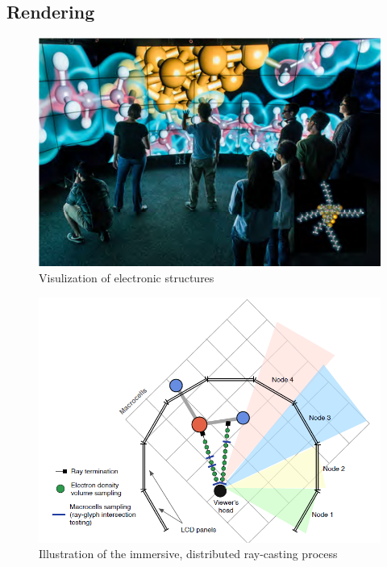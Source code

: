 \documentclass[10pt,twocolumn,letterpaper]{article}
\begin{document}
\subsection{Rendering}
\begin{figure}
	\includegraphics{atomistic_4.png}
	\caption{Visulization of electronic structures}
	\label{img:atomistic1}
\end{figure}
\begin{figure}
	\includegraphics{atomistic_6.png}
	\caption{Illustration of the immersive, distributed ray-casting process}
	\label{img:atomistic2}
\end{figure}
\end{document}
